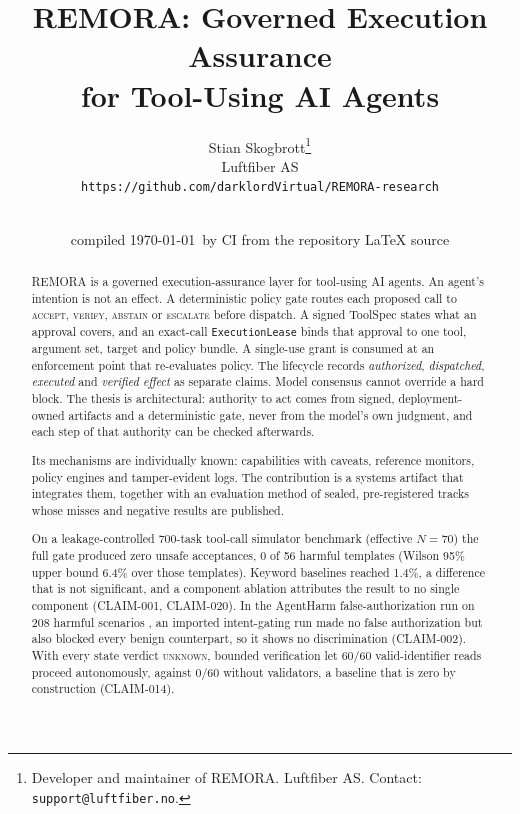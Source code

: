 \documentclass[10pt,twocolumn]{article}
\title{REMORA: Governed Execution Assurance\\for Tool-Using AI Agents}
\author{
  Stian Skogbrott\thanks{Developer and maintainer of REMORA. Luftfiber AS.
  Contact: \texttt{support@luftfiber.no}.}\\
  Luftfiber AS\\
  \texttt{https://github.com/darklordVirtual/REMORA-research}
}
\date{\paperversion\\ \small compiled \today\ by CI from the repository LaTeX source}
\begin{document}
\maketitle

\begin{abstract}
REMORA is a governed execution-assurance layer for tool-using AI agents.
An agent's intention is not an effect. A deterministic policy gate routes
each proposed call to \textsc{accept}, \textsc{verify}, \textsc{abstain} or
\textsc{escalate} before dispatch. A signed ToolSpec states what an approval
covers, and an exact-call \texttt{ExecutionLease} binds that approval to one
tool, argument set, target and policy bundle. A single-use grant is consumed
at an enforcement point that re-evaluates policy. The lifecycle records
\emph{authorized}, \emph{dispatched}, \emph{executed} and \emph{verified
effect} as separate claims. Model consensus cannot override a hard block.
The thesis is architectural: authority to act comes from signed,
deployment-owned artifacts and a deterministic gate, never from the model's
own judgment, and each step of that authority can be checked afterwards.

Its mechanisms are individually known: capabilities with caveats, reference
monitors, policy engines and tamper-evident logs. The contribution is a
systems artifact that integrates them, together with an evaluation method of
sealed, pre-registered tracks whose misses and negative results are published.

On a leakage-controlled 700-task tool-call simulator benchmark (effective
$N=70$) the full gate produced zero unsafe acceptances, 0 of 56 harmful
templates (Wilson 95\% upper bound 6.4\% over those templates). Keyword baselines reached 1.4\%, a difference that is not
significant, and a component ablation attributes the result to no single
component (CLAIM-001, CLAIM-020). In the AgentHarm false-authorization run
on 208 harmful scenarios
\cite{andriushchenko2024agentharm}, an imported intent-gating run made no
false authorization but also blocked every benign counterpart, so it shows no
discrimination (CLAIM-002). With every state verdict \textsc{unknown},
bounded verification let 60/60 valid-identifier reads proceed autonomously,
against 0/60 without validators, a baseline that is zero by construction
(CLAIM-014).


\end{abstract}
\end{document}
